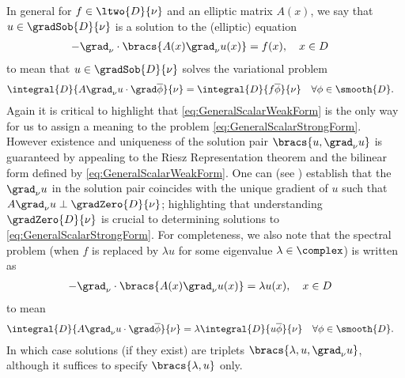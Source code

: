 In general for $f\in\ltwo{D}{\nu}$ and an elliptic matrix $A(x)$, we say that $u\in\gradSob{D}{\nu}$ is a solution to the (elliptic) equation
\begin{align} \label{eq:GeneralScalarStrongForm}
	-\grad_\nu \cdot \bracs{A(x)\grad_\nu u(x)} &= f(x), \quad x\in D
\end{align}
to mean that $u\in\gradSob{D}{\nu}$ solves the variational problem
\begin{align} \label{eq:GeneralScalarWeakForm}
	\integral{D}{A\grad_\nu u \cdot \grad\overline{\phi}}{\nu} &= \integral{D}{f\overline{\phi}}{\nu} \quad \forall \phi\in\smooth{D}.
\end{align}
Again it is critical to highlight that \eqref{eq:GeneralScalarWeakForm} is the only way for us to assign a meaning to the problem \eqref{eq:GeneralScalarStrongForm}.
However existence and uniqueness of the solution pair $\bracs{u,\grad_\nu u}$ is guaranteed by appealing to the Riesz Representation theorem and the bilinear form defined by \eqref{eq:GeneralScalarWeakForm}.
One can (see \cite{zhikov2000extension}) establish that the $\grad_\nu u$ in the solution pair coincides with the unique gradient of $u$ such that $A\grad_\nu u \perp \gradZero{D}{\nu}$; highlighting that understanding $\gradZero{D}{\nu}$ is crucial to determining solutions to \eqref{eq:GeneralScalarStrongForm}.
For completeness, we also note that the spectral problem (when $f$ is replaced by $\lambda u$ for some eigenvalue $\lambda\in\complex$) is written as
\begin{align*}
	-\grad_\nu \cdot \bracs{A(x)\grad_\nu u(x)} &= \lambda u(x), \quad x\in D
\end{align*}
to mean
\begin{align*}
	\integral{D}{A\grad_\nu u \cdot \grad\overline{\phi}}{\nu} &= \lambda\integral{D}{u\overline{\phi}}{\nu} \quad \forall \phi\in\smooth{D}.
\end{align*}
In which case solutions (if they exist) are triplets $\bracs{\lambda, u, \grad_\nu u}$, although it suffices to specify $\bracs{\lambda, u}$ only. \newline

